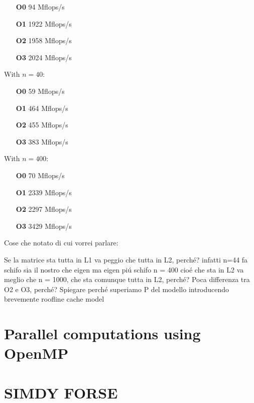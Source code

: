 \documentclass[11pt,a4paper,oneside,titlepage,openright]{book}
\begin{document}
\begin{itemize}
\item[\textbf{O0}] 94  Mflops/s
\item[\textbf{O1}] 1922 Mflops/s
\item[\textbf{O2}] 1958 Mflops/s
\item[\textbf{O3}] 2024 Mflops/s
\end{itemize}

With $n = 40$:

\begin{itemize}
\item[\textbf{O0}] 59  Mflops/s
\item[\textbf{O1}] 464 Mflops/s
\item[\textbf{O2}] 455 Mflops/s
\item[\textbf{O3}] 383 Mflops/s
\end{itemize}

With $n=400$:

\begin{itemize}
\item[\textbf{O0}] 70  Mflops/s
\item[\textbf{O1}] 2339 Mflops/s
\item[\textbf{O2}] 2297 Mflops/s
\item[\textbf{O3}] 3429 Mflops/s
\end{itemize}








Cose che notato di cui vorrei parlare:

Se la matrice sta tutta in L1 va peggio che tutta in L2, perch\'e? infatti n=44 fa schifo sia il nostro che eigen ma eigen pi\'u schifo 
n = 400 cio\'e che sta in L2 va meglio che n = 1000, che sta comunque tutta in L2, perch\'e?
Poca differenza tra O2 e O3, perch\'e?
Spiegare perch\'e superiamo P del modello introducendo brevemente roofline cache model 

\chapter{Parallel computations using OpenMP}





\chapter{SIMDY FORSE} 
\end{document}
